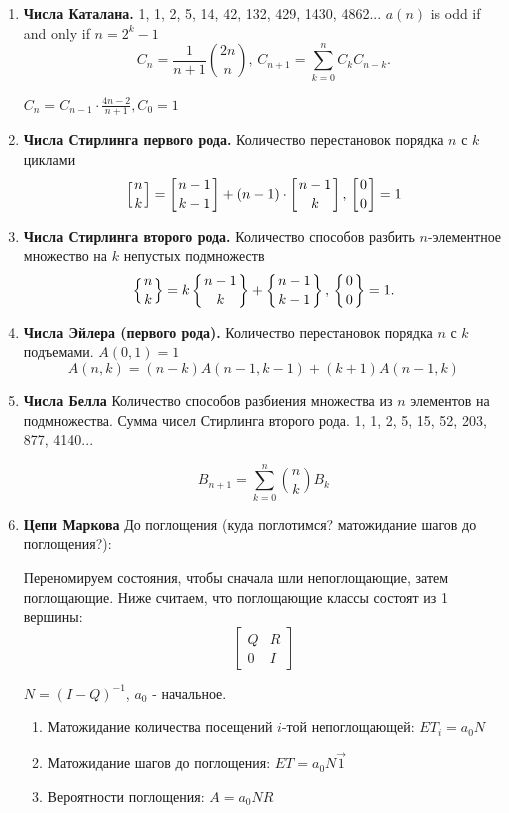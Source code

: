 \begin{enumerate}
    \item \textbf{Числа Каталана.} 1, 1, 2, 5, 14, 42, 132, 429, 1430, 4862... $a(n)$ is odd if and only if $n=2^{k}-1$
    \[
        C_n = \frac{1}{n+1}\binom{2n}{n}, \, C_{n+1} = \sum_{k=0}^n C_k C_{n-k}.
    \]

    $C_n = C_{n-1} \cdot \frac{4n - 2}{n+1}, C_0 = 1$
    
    \item \textbf{Числа Стирлинга первого рода.} Количество перестановок порядка $n$ с $k$ циклами
    \[
        \left[ {n \atop k} \right] = \left[ {n-1 \atop k-1} \right] + (n-1) \cdot \left[ {n-1 \atop k} \right], \, 
        \left[ {0 \atop 0} \right] = 1
    \]

    \item \textbf{Числа Стирлинга второго рода.} Количество способов разбить $n$-элементное множество на $k$ непустых подмножеств
    \[
        \left\{ {n \atop k} \right\} = k \left\{ {n-1 \atop k} \right\} + \left\{ {n-1 \atop k-1} \right\}, \, 
        \left\{ {0 \atop 0} \right\} = 1.
    \]

    \item \textbf{Числа Эйлера (первого рода).} Количество перестановок порядка $n$ с $k$ подъемами. $A(0, 1)=1$
    \[
        A(n,k) = (n-k)A(n-1, k-1) + (k+1)A(n-1,k)
    \]

    \item \textbf{Числа Белла} Количество способов разбиения множества из $n$ элементов на подмножества. Сумма чисел Стирлинга второго рода. 1, 1, 2, 5, 15, 52, 203, 877, 4140... 

    \[
        B_{n+1} = \sum_{k=0}^{n} \binom{n}{k} B_{k}
    \]

    \item \textbf{Цепи Маркова}
    До поглощения (куда поглотимся? матожидание шагов до поглощения?):

    Переномируем состояния, чтобы сначала шли непоглощающие, затем поглощающие. Ниже считаем, что поглощающие классы состоят из 1 вершины:  
        \[
    \left[
    \begin{array}{c|c}
        Q & R \\
        \hline
        0 & I
    \end{array}
    \right]
    \]

    $N = (I - Q)^{-1}$, $a_0$ - начальное.

    \begin{enumerate}
        \item Матожидание количества посещений $i$-той непоглощающей: $ET_i = a_0 N$
        \item Матожидание шагов до поглощения: $ET = a_0 N \vec{1}$
        \item Вероятности поглощения: $A = a_0 N R$
    \end{enumerate}


\end{enumerate}
